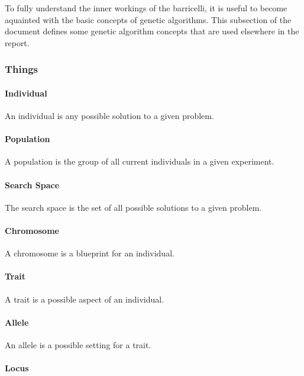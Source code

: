 To fully understand the inner workings of the \Gls{barricelli}, it is useful to become aquainted with the basic concepts of genetic algorithms.
This subsection of the document defines some genetic algorithm concepts that are used elsewhere in the report.

\subsubsection{Things}

\paragraph{Individual}

An individual is any possible solution to a given problem.

\paragraph{Population}

A population is the group of all current individuals in a given experiment.

\paragraph{Search Space}

The search space is the set of all possible solutions to a given problem.

\paragraph{Chromosome}

A chromosome is a blueprint for an individual.

\paragraph{Trait}

A trait is a possible aspect of an individual.

\paragraph{Allele}

An allele is a possible setting for a trait.

\paragraph{Locus}

